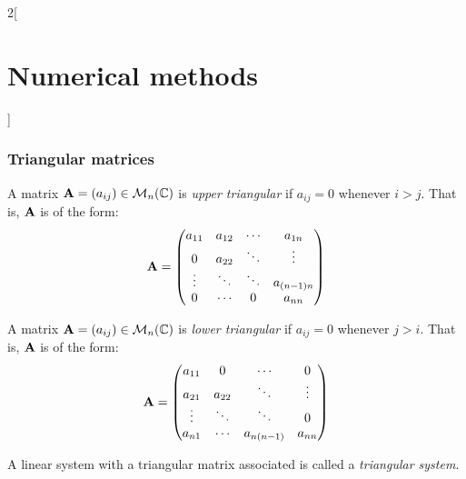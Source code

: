 \documentclass[../../../main.tex]{subfiles}
\begin{document}
\begin{multicols}{2}[\section{Numerical methods}]
    \subsubsection*{Triangular matrices}
    \begin{definition}
        A matrix $\vb{A}=(a_{ij})\in\mathcal{M}_n(\mathbb{C})$ is \textit{upper triangular} if $a_{ij}=0$ whenever $i>j$. That is, $\vb{A}$ is of the form:
        $$\vb{A}=
            \begin{pmatrix}
                a_{11} & a_{12} & \cdots & a_{1n}     \\
                0      & a_{22} & \ddots & \vdots     \\
                \vdots & \ddots & \ddots & a_{(n-1)n} \\
                0      & \cdots & 0      & a_{nn}
            \end{pmatrix}
        $$
    \end{definition}
    \begin{definition}
        A matrix $\vb{A}=(a_{ij})\in\mathcal{M}_n(\mathbb{C})$ is \textit{lower triangular} if $a_{ij}=0$ whenever $j>i$. That is, $\vb{A}$ is of the form:
        $$\vb{A}=
            \begin{pmatrix}
                a_{11} & 0      & \cdots     & 0      \\
                a_{21} & a_{22} & \ddots     & \vdots \\
                \vdots & \ddots & \ddots     & 0      \\
                a_{n1} & \cdots & a_{n(n-1)} & a_{nn}
            \end{pmatrix}
        $$
    \end{definition}
    \begin{definition}
        A linear system with a triangular matrix associated is called a \textit{triangular system}.
    \end{definition}

\end{multicols}
\end{document}
